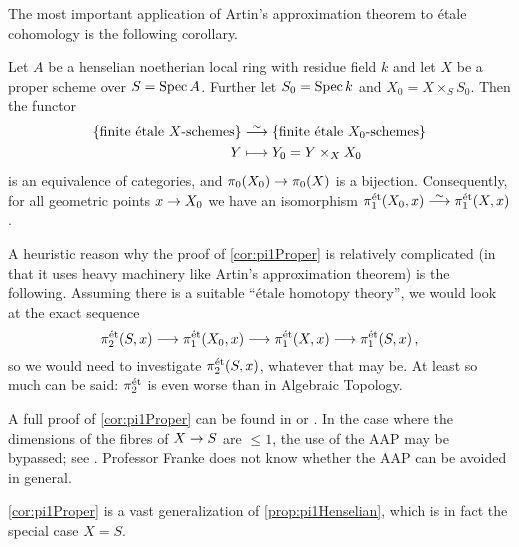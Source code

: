 \documentclass[a4paper, 10pt, oneside, DIV=9, chapterprefix=true, numbers=enddot, bibliography=totoc]{scrbook}
\begin{document}
The most important application of Artin's approximation theorem to étale cohomology is the following corollary.
\begin{cor}\label{cor:pi1Proper}
	Let $A$ be a henselian noetherian local ring with residue field $k$ and let $X$ be a proper scheme over $S=\operatorname{Spec} A$. Further let $S_0=\operatorname{Spec} k$ and $X_0=X\times_SS_0$. Then the functor
	\begin{align*}
		\left\{\text{finite étale $X$-schemes}\right\}&\isomorphism \left\{\text{finite étale $X_0$-schemes}\right\}\\
		Y&\longmapsto Y_0=Y\times_XX_0
	\end{align*}
	is an equivalence of categories, and $\pi_0(X_0)\morphism\pi_0(X)$ is a bijection. Consequently, for all geometric points $x\morphism X_0$ we have an isomorphism $\pi_1^\et(X_0,x)\isomorphism\pi_1^\et(X,x)$.
\end{cor}
\begin{rem}
	\begin{alphanumerate}
		\item A heuristic reason why the proof of \cref{cor:pi1Proper} is relatively complicated (in that it uses heavy machinery like Artin's approximation theorem) is the following. Assuming there is a suitable \enquote{étale homotopy theory}, we would look at the exact sequence
		\begin{equation*}
		\pi_2^\et(S,x)\morphism\pi_1^\et(X_0,x)\morphism\pi_1^\et(X,x)\morphism\pi_1^\et(S,x)\,,
		\end{equation*}
		so we would need to investigate $\pi_2^{\mathrm{\acute{e}t}}(S,x)$, whatever that may be. At least so much can be said: $\pi_2^{\mathrm{\acute{e}t}}$ is even worse than in Algebraic Topology.
		\item A full proof of \cref{cor:pi1Proper} can be found in \cite[Arcata IV Prop.]{sga4.5} or \cite[]{stacks-project}. In the case where the dimensions of the fibres of $X\morphism S$ are $\leq 1$, the use of the AAP may be bypassed; see \cite[Exposé~XIII Prop.]{sga4.3}. Professor Franke does not know whether the AAP can be avoided in general.
		\item \cref{cor:pi1Proper} is a vast generalization of \cref{prop:pi1Henselian}, which is in fact the special case $X=S$.
	\end{alphanumerate}
\end{rem}
\end{document}
